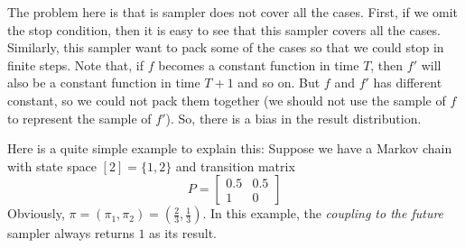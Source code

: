 The problem here is that is sampler does not cover all the cases.
First, if we omit the stop condition, then it is easy to see that this sampler covers all the cases. Similarly, this sampler want to pack some of the cases so that we could stop in finite steps. Note that, if $f$ becomes a constant function in time $T$, then $f'$ will also be a constant function in time $T+1$ and so on. But $f$ and $f'$ has different constant, so we could not pack them together (we should not use the sample of $f$ to represent the sample of $f'$).
So, there is a bias in the result distribution.

Here is a quite simple example to explain this:
Suppose we have a Markov chain with state space $[2] = \{1, 2\}$ and transition matrix
\[P = \left[
    \begin{array}{cc}
      0.5 & 0.5 \\
      1   & 0
    \end{array}
  \right]\]
Obviously, $\pi = (\pi_1, \pi_2) = (\frac{2}{3}, \frac{1}{3})$.
In this example, the \emph{coupling to the future} sampler always returns $1$ as its result.

\begin{center}
\end{center}

